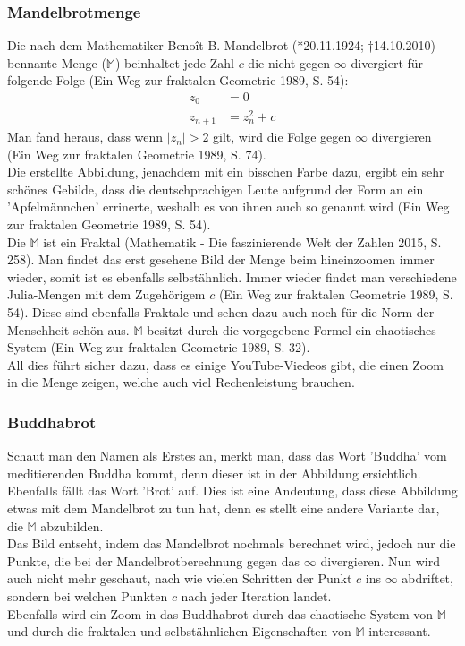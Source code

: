 \subsubsection{Mandelbrotmenge}
Die nach dem Mathematiker Benoît B. Mandelbrot (*20.11.1924; †14.10.2010) bennante Menge ($\mathbb{M}$) beinhaltet jede Zahl $c$ die nicht gegen $\infty$ divergiert für folgende Folge (Ein Weg zur fraktalen Geometrie 1989, S. 54):
\begin{align*}
z_0&=0\\
z_{n+1}&=z^2_n+c
\end{align*}
Man fand heraus, dass wenn $|z_n| > 2$ gilt, wird die Folge gegen $\infty$ divergieren (Ein Weg zur fraktalen Geometrie 1989, S. 74).\\
Die erstellte Abbildung, jenachdem mit ein bisschen Farbe dazu, ergibt ein sehr schönes Gebilde, dass die deutschprachigen Leute aufgrund der Form an ein 'Apfelmännchen' errinerte, weshalb es von ihnen auch so genannt wird (Ein Weg zur fraktalen Geometrie 1989, S. 54).\\
Die $\mathbb{M}$ ist ein Fraktal (Mathematik - Die faszinierende Welt der Zahlen 2015, S. 258). Man findet das erst gesehene Bild der Menge beim hineinzoomen immer wieder, somit ist es ebenfalls selbstähnlich. Immer wieder findet man verschiedene Julia-Mengen mit dem Zugehörigem $c$ (Ein Weg zur fraktalen Geometrie 1989, S. 54). Diese sind ebenfalls Fraktale und sehen dazu auch noch für die Norm der Menschheit schön aus. $\mathbb{M}$ besitzt durch die vorgegebene Formel ein chaotisches System (Ein Weg zur fraktalen Geometrie 1989, S. 32).\\
All dies führt sicher dazu, dass es einige YouTube-Viedeos gibt, die einen Zoom in die Menge zeigen, welche auch viel Rechenleistung brauchen.

\subsubsection{Buddhabrot}
Schaut man den Namen als Erstes an, merkt man, dass das Wort 'Buddha' vom meditierenden Buddha kommt, denn dieser ist in der Abbildung ersichtlich. Ebenfalls fällt das Wort 'Brot' auf. Dies ist eine Andeutung, dass diese Abbildung etwas mit dem Mandelbrot zu tun hat, denn es stellt eine andere Variante dar, die $\mathbb{M}$ abzubilden.\\ 
Das Bild entseht, indem das Mandelbrot nochmals berechnet wird, jedoch nur die Punkte, die bei der Mandelbrotberechnung gegen das $\infty$ divergieren. Nun wird auch nicht mehr geschaut, nach wie vielen Schritten der Punkt $c$ ins $\infty$ abdriftet, sondern bei welchen Punkten $c$ nach jeder Iteration landet.\\
Ebenfalls wird ein Zoom in das Buddhabrot durch das chaotische System von $\mathbb{M}$ und durch die fraktalen und selbstähnlichen Eigenschaften von $\mathbb{M}$ interessant.